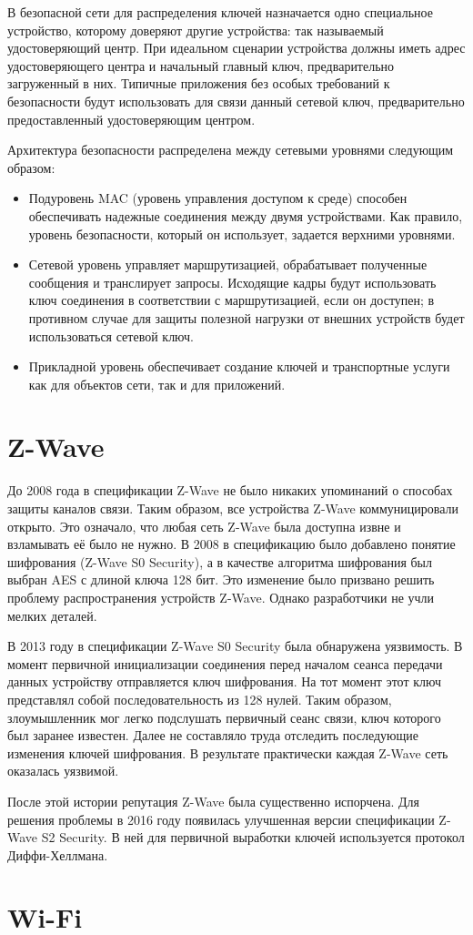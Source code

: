 	В безопасной сети для распределения ключей назначается одно специальное устройство, которому доверяют 
	другие устройства: так называемый удостоверяющий центр. При идеальном сценарии устройства должны 
	иметь адрес удостоверяющего центра и начальный главный ключ, предварительно загруженный в них. 
	Типичные приложения без особых требований к безопасности будут использовать для связи данный сетевой ключ, 
	предварительно предоставленный удостоверяющим центром.
	
	Архитектура безопасности распределена между сетевыми уровнями следующим образом:
	
	\begin{itemize}
		\item Подуровень MAC (уровень управления доступом к среде) способен обеспечивать надежные соединения
		между двумя устройствами. Как правило, уровень безопасности, который он использует, задается 
		верхними уровнями.
		\item Сетевой уровень управляет маршрутизацией, обрабатывает полученные сообщения и транслирует
		запросы. Исходящие кадры будут использовать ключ соединения в соответствии с маршрутизацией, 
		если он доступен; в противном случае для защиты полезной нагрузки от внешних устройств будет 
		использоваться сетевой ключ.
		\item Прикладной уровень обеспечивает создание ключей и транспортные услуги как для объектов
		сети, так и для приложений.
	\end{itemize}

	
	\section{Z-Wave}
	До 2008 года в спецификации Z-Wave не было никаких упоминаний о способах защиты каналов связи. 
	Таким образом, все устройства Z-Wave коммуницировали открыто. Это означало, что любая сеть Z-Wave 
	была доступна извне и взламывать её было не нужно. В 2008 в спецификацию было добавлено понятие 
	шифрования (Z-Wave S0 Security), а в качестве алгоритма шифрования был выбран AES с длиной ключа 128 бит. 
	Это изменение было призвано решить проблему распространения устройств Z-Wave. Однако разработчики
	не учли мелких деталей.
	
	В 2013 году в спецификации  Z-Wave S0 Security была обнаружена уязвимость. В момент первичной 
	инициализации соединения перед началом сеанса передачи данных устройству отправляется ключ шифрования.
	На тот момент этот ключ представлял собой последовательность из 128 нулей. Таким образом, злоумышленник
	мог легко подслушать первичный сеанс связи, ключ которого был заранее известен. Далее не
	составляло труда отследить последующие изменения ключей шифрования. В результате практически
	каждая Z-Wave сеть оказалась уязвимой.
	
	После этой истории репутация Z-Wave была существенно испорчена. Для решения проблемы в 2016 году
	появилась улучшенная версии спецификации Z-Wave S2 Security. В ней для первичной выработки ключей
	используется протокол Диффи-Хеллмана.
	
	
	\section{Wi-Fi}
		
		
